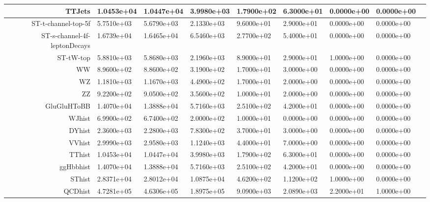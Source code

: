 \begin{landscape}
\begin{table}[htb]
\begin{tabular}{rllllllll}
 \hline 
TTJets&1.0453e+04&1.0447e+04&3.9980e+03&1.7900e+02&6.3000e+01&0.0000e+00&0.0000e+00\\
 \hline 
ST-t-channel-top-5f&5.7510e+03&5.6790e+03&2.1330e+03&9.6000e+01&2.9000e+01&0.0000e+00&0.0000e+00\\
 \hline 
ST-s-channel-4f-leptonDecays&1.6739e+04&1.6465e+04&6.5460e+03&2.7700e+02&5.4000e+01&0.0000e+00&0.0000e+00\\
 \hline 
ST-tW-top&5.8810e+03&5.8680e+03&2.1960e+03&8.9000e+01&2.9000e+01&1.0000e+00&0.0000e+00\\
 \hline 
WW&8.9600e+02&8.8600e+02&3.1900e+02&1.7000e+01&3.0000e+00&0.0000e+00&0.0000e+00\\
 \hline 
WZ&1.1810e+03&1.1670e+03&4.4900e+02&1.7000e+01&2.0000e+00&0.0000e+00&0.0000e+00\\
 \hline 
ZZ&9.2200e+02&9.0500e+02&3.5600e+02&1.0000e+01&2.0000e+00&0.0000e+00&0.0000e+00\\
 \hline 
GluGluHToBB&1.4070e+04&1.3888e+04&5.7160e+03&2.5100e+02&4.2000e+01&0.0000e+00&0.0000e+00\\
 \hline 
WJhist&6.9900e+02&6.7400e+02&2.0000e+02&1.0000e+01&0.0000e+00&0.0000e+00&0.0000e+00\\
 \hline 
DYhist&2.3600e+03&2.2800e+03&7.8300e+02&3.7000e+01&3.0000e+00&0.0000e+00&0.0000e+00\\
 \hline 
VVhist&2.9990e+03&2.9580e+03&1.1240e+03&4.4000e+01&7.0000e+00&0.0000e+00&0.0000e+00\\
 \hline 
TThist&1.0453e+04&1.0447e+04&3.9980e+03&1.7900e+02&6.3000e+01&0.0000e+00&0.0000e+00\\
 \hline 
ggHbbhist&1.4070e+04&1.3888e+04&5.7160e+03&2.5100e+02&4.2000e+01&0.0000e+00&0.0000e+00\\
 \hline 
SThist&2.8371e+04&2.8012e+04&1.0875e+04&4.6200e+02&1.1200e+02&1.0000e+00&0.0000e+00\\
 \hline 
QCDhist&4.7281e+05&4.6306e+05&1.8975e+05&9.0900e+03&2.0890e+03&2.2000e+01&1.0000e+00\\
\end{tabular}
\label{tab:Unitcutfl}
\centering
\end{table}
\end{landscape}







